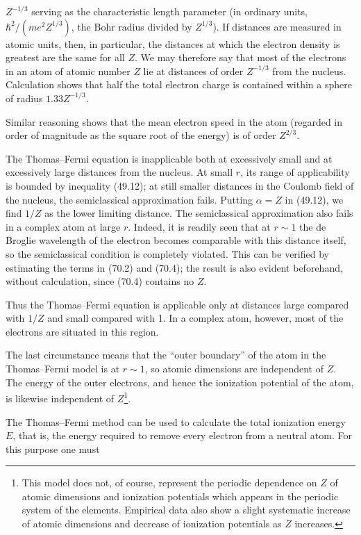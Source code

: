 $Z^{-1/3}$ serving as the characteristic length parameter (in ordinary units, $\hbar^2/(me^2Z^{1/3})$, the Bohr radius divided by $Z^{1/3}$). If distances are measured in atomic units, then, in particular, the distances at which the electron density is greatest are the same for all $Z$. We may therefore say that most of the electrons in an atom of atomic number $Z$ lie at distances of order $Z^{-1/3}$ from the nucleus. Calculation shows that half the total electron charge is contained within a sphere of radius $1.33Z^{-1/3}$.

Similar reasoning shows that the mean electron speed in the atom (regarded in order of magnitude as the square root of the energy) is of order $Z^{2/3}$.

The Thomas--Fermi equation is inapplicable both at excessively small and at excessively large distances from the nucleus. At small $r$, its range of applicability is bounded by inequality (49.12); at still smaller distances in the Coulomb field of the nucleus, the semiclassical approximation fails. Putting $\alpha=Z$ in (49.12), we find $1/Z$ as the lower limiting distance. The semiclassical approximation also fails in a complex atom at large $r$. Indeed, it is readily seen that at $r\sim1$ the de Broglie wavelength of the electron becomes comparable with this distance itself, so the semiclassical condition is completely violated. This can be verified by estimating the terms in (70.2) and (70.4); the result is also evident beforehand, without calculation, since (70.4) contains no $Z$.

Thus the Thomas--Fermi equation is applicable only at distances large compared with $1/Z$ and small compared with 1. In a complex atom, however, most of the electrons are situated in this region.

The last circumstance means that the ``outer boundary'' of the atom in the Thomas--Fermi model is at $r\sim1$, so atomic dimensions are independent of $Z$. The energy of the outer electrons, and hence the ionization potential of the atom, is likewise independent of $Z$\footnote{This model does not, of course, represent the periodic dependence on $Z$ of atomic dimensions and ionization potentials which appears in the periodic system of the elements. Empirical data also show a slight systematic increase of atomic dimensions and decrease of ionization potentials as $Z$ increases.}.

The Thomas--Fermi method can be used to calculate the total ionization energy $E$, that is, the energy required to remove every electron from a neutral atom. For this purpose one must

